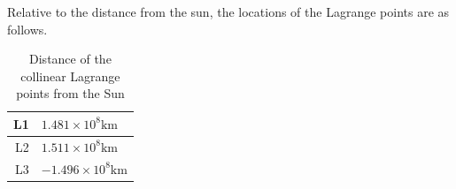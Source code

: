 Relative to the distance from the sun, the locations of the Lagrange points are as follows.
\begin{table}[h!]
	\centering
	\label{tab:lagrange-points}
	\caption{Distance of the collinear Lagrange points from the Sun}
	\vspace*{0.3cm}
	\begin{tabular}{|r|l|}
		\hline
		L1 & $1.481\times10^8 \si{\kilo\metre}$ \\
		\hline
		L2 & $1.511\times10^8 \si{\kilo\metre}$ \\
		\hline
		L3 & $-1.496\times10^8 \si{\kilo\metre}$ \\
		\hline
	\end{tabular}
\end{table}